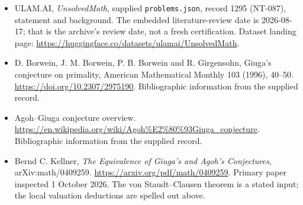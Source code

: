 \documentclass[11pt,a4paper]{article}
\begin{document}
{\small

\begin{itemize}

\item[\hypertarget{source:1295:1}{S1}] ULAM.AI, \emph{UnsolvedMath}, supplied \texttt{problems.json}, record 1295 (NT-087), statement and background. The embedded literature-review date is 2026-08-17; that is the archive’s review date, not a fresh certification. Dataset landing page: \url{https://huggingface.co/datasets/ulamai/UnsolvedMath}.

\item[\hypertarget{source:1295:2}{S2}] D. Borwein, J. M. Borwein, P. B. Borwein and R. Girgensohn, Giuga's conjecture on primality, American Mathematical Monthly 103 (1996), 40--50. \url{https://doi.org/10.2307/2975190}. Bibliographic information from the supplied record.

\item[\hypertarget{source:1295:3}{S3}] Agoh--Giuga conjecture overview. \url{https://en.wikipedia.org/wiki/Agoh%E2%80%93Giuga_conjecture}. Bibliographic information from the supplied record.


\item[E1] Bernd C. Kellner, \emph{The Equivalence of Giuga's and
Agoh's Conjectures}, arXiv:math/0409259.
\url{https://arxiv.org/pdf/math/0409259}.
Primary paper inspected 1 October 2026. The von Staudt--Clausen theorem
is a stated input; the local valuation deductions are spelled out above.

\end{itemize}

}

\label{end:1295}
\end{document}
